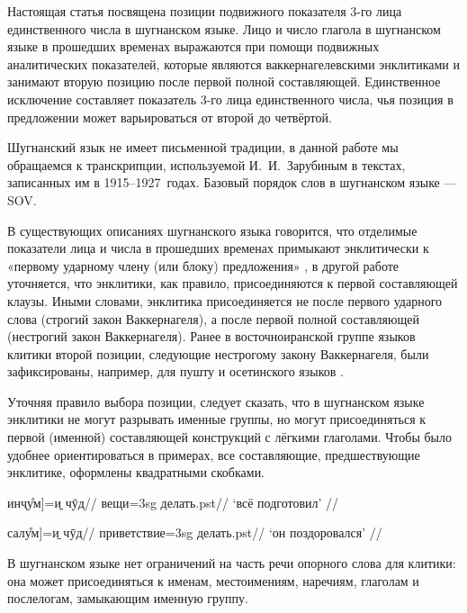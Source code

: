 Настоящая статья посвящена позиции подвижного показателя 3-го лица единственного числа в шугнанском языке. Лицо и число глагола в шугнанском языке в прошедших временах выражаются при помощи подвижных аналитических показателей, которые являются ваккернагелевскими энклитиками и занимают вторую позицию после первой полной составляющей. Единственное исключение составляет показатель 3-го лица единственного числа, чья позиция в предложении может варьироваться от второй до четвёртой.

Шугнанский язык не имеет письменной традиции, в данной работе мы обращаемся к транскрипции, используемой И.~И.~Зарубиным в текстах, записанных им в 1915–1927~годах. Базовый порядок слов в шугнанском языке — SOV.

В существующих описаниях шугнанского языка говорится, что отделимые показатели лица и числа в прошедших временах примыкают энклитически к «первому ударному члену (или блоку) предложения» \parencite[237]{edelman_yusufbekov1999_shughni}, в другой работе \parencite[799]{edelman_dodykhudoeva2009_shughni} уточняется, что энклитики, как правило, присоединяются к первой составляющей клаузы. Иными словами, энклитика присоединяется не после первого ударного слова (строгий закон Ваккернагеля), а после первой полной составляющей (нестрогий закон Ваккернагеля). Ранее в восточноиранской группе языков клитики второй позиции, следующие нестрогому закону Ваккернагеля, были зафиксированы, например, для пушту \parencite[82]{tegey1977} и осетинского языков \parencite[157]{abaev1959}.

Уточняя правило выбора позиции, следует сказать, что в шугнанском языке энклитики не могут разрывать именные группы, но могут присоединяться к первой (именной) составляющей конструкций с лёгкими глаголами. Чтобы было удобнее ориентироваться в примерах, все составляющие, предшествующие энклитике, оформлены квадратными скобками.

\begingl
\gla {[}инҷу̊м{]}=\b{и} чӯд//
\glc вещи={\sc 3sg} делать.{\sc pst}//
\glft ‘всё подготовил’ //
\endgl \xe

\begingl
\gla {[}салу̊м{]}=\b{и} чӯд//
\glc приветствие={\sc 3sg} делать.{\sc pst}//
\glft ‘он поздоровался’ //
\endgl \xe

В шугнанском языке нет ограничений на часть речи опорного слова для клитики: она может присоединяться к именам, местоимениям, наречиям, глаголам и послелогам, замыкающим именную группу.

